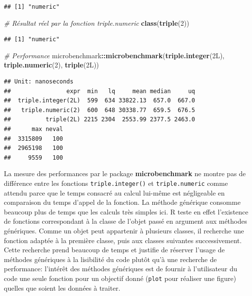 \documentclass[
  12pt,
  french,
  a4paper,
  extrafontsizes,onecolumn,openright
  ]{memoir}
\newenvironment{Shaded}{\begin{snugshade}}{\end{snugshade}}
\newcommand{\CommentTok}[1]{\textcolor[rgb]{0.56,0.35,0.01}{\textit{#1}}}
\newcommand{\DecValTok}[1]{\textcolor[rgb]{0.00,0.00,0.81}{#1}}
\newcommand{\KeywordTok}[1]{\textcolor[rgb]{0.13,0.29,0.53}{\textbf{#1}}}
\newcommand{\NormalTok}[1]{#1}
\newcommand{\OperatorTok}[1]{\textcolor[rgb]{0.81,0.36,0.00}{\textbf{#1}}}
\newlength{\rf}
\begin{document}
\begin{verbatim}
## [1] "numeric"
\end{verbatim}

\begin{Shaded}
\begin{Highlighting}[]
\CommentTok{# Résultat réel par la fonction triple.numeric}
\KeywordTok{class}\NormalTok{(}\KeywordTok{triple}\NormalTok{(}\DecValTok{2}\NormalTok{))}
\end{Highlighting}
\end{Shaded}

\begin{verbatim}
## [1] "numeric"
\end{verbatim}

\begin{Shaded}
\begin{Highlighting}[]
\CommentTok{# Performance}
\NormalTok{microbenchmark}\OperatorTok{::}\KeywordTok{microbenchmark}\NormalTok{(}\KeywordTok{triple.integer}\NormalTok{(2L), }\KeywordTok{triple.numeric}\NormalTok{(}\DecValTok{2}\NormalTok{),}
    \KeywordTok{triple}\NormalTok{(2L))}
\end{Highlighting}
\end{Shaded}

\begin{verbatim}
## Unit: nanoseconds
##                expr  min   lq     mean median     uq
##  triple.integer(2L)  599  634 33822.13  657.0  667.0
##   triple.numeric(2)  600  648 30338.77  659.5  676.5
##          triple(2L) 2215 2304  2553.99 2377.5 2463.0
##      max neval
##  3315809   100
##  2965198   100
##     9559   100
\end{verbatim}

\normalsize

La mesure des performances par le package \textbf{microbenchmark} ne montre pas de différence entre les fonctions \texttt{triple.integer()} et \texttt{triple.numeric} comme attendu parce que le temps consacré au calcul lui-même est négligeable en comparaison du temps d'appel de la fonction.
La méthode générique consomme beaucoup plus de temps que les calculs très simples ici.
R teste en effet l'existence de fonctions correspondant à la classe de l'objet passé en argument aux méthodes génériques.
Comme un objet peut appartenir à plusieurs classes, il recherche une fonction adaptée à la première classe, puis aux classes suivantes successivement.
Cette recherche prend beaucoup de temps et justifie de réserver l'usage de méthodes génériques à la lisibilité du code plutôt qu'à une recherche de performance: l'intérêt des méthodes génériques est de fournir à l'utilisateur du code une seule fonction pour un objectif donné (\texttt{plot} pour réaliser une figure) quelles que soient les données à traiter.
\end{document}
